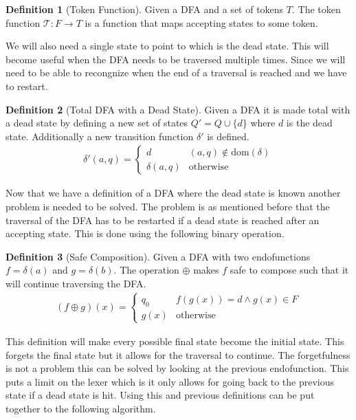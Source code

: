 \documentclass[a4paper,12pt]{article}
\theoremstyle{definition}
\newtheorem{definition}{Definition}[section]
\begin{document}
\begin{definition}[Token Function]
  Given a DFA and a set of tokens $T$. The token function $\mathcal{T}: F \to T$ is a function that maps accepting states to some token.
\end{definition}
\noindent We will also need a single state to point to which is the dead state. This will become useful when the DFA needs to be traversed multiple times. Since we will need to be able to recongnize when the end of a traversal is reached and we have to restart.

\begin{definition}[Total DFA with a Dead State]
  Given a DFA it is made total with a dead state by defining a new set of states $Q' = Q \cup \{d\}$ where $d$ is the dead state. Additionally a new transition function $\delta'$ is defined.
  \begin{align*}
    \delta'(a, q) = \begin{cases}
      d &  (a, q) \notin \text{dom}(\delta) \\
      \delta(a, q) & \text{otherwise}
    \end{cases}
  \end{align*}
\end{definition}
\noindent Now that we have a definition of a DFA where the dead state is known another problem is needed to be solved. The problem is as mentioned before that the traversal of the DFA has to be restarted if a dead state is reached after an accepting state. This is done using the following binary operation.

\begin{definition}[Safe Composition]
  Given a DFA with two endofunctions $f = \delta(a)$ and $g = \delta(b)$. The operation $\oplus$ makes $f$ safe to compose such that it will continue traversing the DFA.
  \begin{align*}
    (f \oplus g)(x) =
    \begin{cases}
      q_0 & f(g(x)) = d \land g(x) \in F \\
      g(x) & \text{otherwise} 
    \end{cases}
  \end{align*}
\end{definition}
\noindent This definition will make every possible final state become the initial state. This forgets the final state but it allows for the traversal to continue. The forgetfulness is not a problem this can be solved by looking at the previous endofunction. This puts a limit on the lexer which is it only allows for going back to the previous state if a dead state is hit.
Using this and previous definitions can be put together to the following algorithm.
\end{document}
